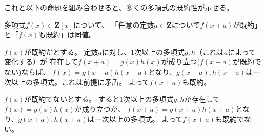 \documentclass[a4j]{jarticle}
\begin{document}
これと以下の命題を組み合わせると、多くの多項式の既約性が示せる。
\begin{Prop}
多項式$f(x) \in \mathbf{Z}[x]$について、
「任意の定数$a \in \mathbf{Z}$について$f(x+a)$が既約」と「$f(x)$も既約」は同値。
\end{Prop}
\begin{Proof}
$f(x)$が既約だとする。
定数$a$に対し、1次以上の多項式$g,h$（これは$a$によって変化する）が
存在して$f(x+a)=g(x)h(x)$が成り立つ($f(x+a)$が既約でない)ならば、
$f(x)=g(x-a)h(x-a)$となり、$g(x-a), h(x-a)$は一次以上の多項式。これは前提に矛盾。
よって$f(x+a)$も既約。

$f(x)$が既約でないとする。
すると1次以上の多項式$g,h$が存在して$f(x)=g(x)h(x)$が成り立つが、
$f(x+a)=g(x+a) h(x+a)$となり、$g(x+a), h(x+a)$は一次以上の多項式。
よって$f(x+a)$も既約でない。
\QED
\end{Proof}
\end{document}
